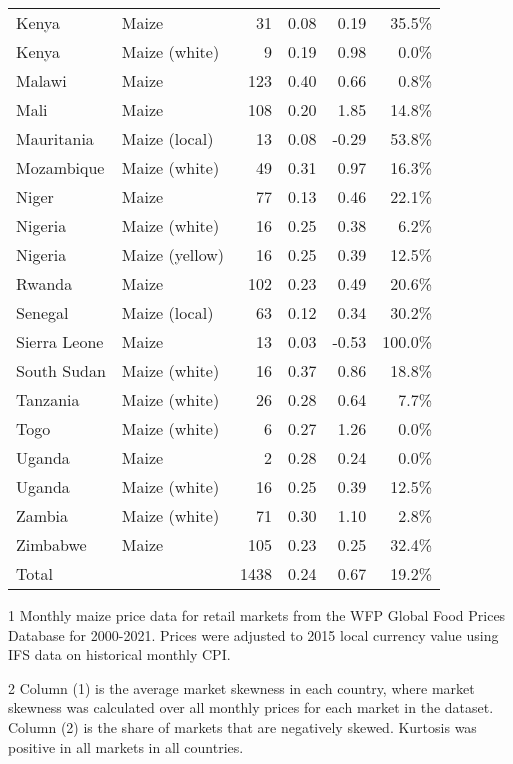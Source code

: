 \begin{table}[ht!]
\begin{threeparttable}[t]
\begin{tabular}{|ll|rrrr|}
  Kenya & Maize &  31 & 0.08 & 0.19 & 35.5\% \\ 
  Kenya & Maize (white) &   9 & 0.19 & 0.98 & 0.0\% \\ 
  Malawi & Maize & 123 & 0.40 & 0.66 & 0.8\% \\ 
  Mali & Maize & 108 & 0.20 & 1.85 & 14.8\% \\ 
  Mauritania & Maize (local) &  13 & 0.08 & -0.29 & 53.8\% \\ 
  Mozambique & Maize (white) &  49 & 0.31 & 0.97 & 16.3\% \\ 
  Niger & Maize &  77 & 0.13 & 0.46 & 22.1\% \\ 
  Nigeria & Maize (white) &  16 & 0.25 & 0.38 & 6.2\% \\ 
  Nigeria & Maize (yellow) &  16 & 0.25 & 0.39 & 12.5\% \\ 
  Rwanda & Maize & 102 & 0.23 & 0.49 & 20.6\% \\ 
  Senegal & Maize (local) &  63 & 0.12 & 0.34 & 30.2\% \\ 
  Sierra Leone & Maize &  13 & 0.03 & -0.53 & 100.0\% \\ 
  South Sudan & Maize (white) &  16 & 0.37 & 0.86 & 18.8\% \\ 
  Tanzania & Maize (white) &  26 & 0.28 & 0.64 & 7.7\% \\ 
  Togo & Maize (white) &   6 & 0.27 & 1.26 & 0.0\% \\ 
  Uganda & Maize &   2 & 0.28 & 0.24 & 0.0\% \\ 
  Uganda & Maize (white) &  16 & 0.25 & 0.39 & 12.5\% \\ 
  Zambia & Maize (white) &  71 & 0.30 & 1.10 & 2.8\% \\ 
  Zimbabwe & Maize & 105 & 0.23 & 0.25 & 32.4\% \\ 
  \hline
  Total &  & 1438 & 0.24 & 0.67 & 19.2\% \\ 
 \hline
\end{tabular}
\begin{tablenotes}
\item [1] \footnotesize Monthly maize price data for retail markets from the WFP Global Food Prices Database for 2000-2021. Prices were adjusted to 2015 local currency value using IFS data on historical monthly CPI.
\item[2] Column (1) is the average market skewness in each country, where market skewness was calculated over all monthly prices for each market in the dataset. Column (2) is the share of markets that are negatively skewed. Kurtosis was positive in all markets in all countries. 
\end{tablenotes}
\end{threeparttable}
\end{table}
